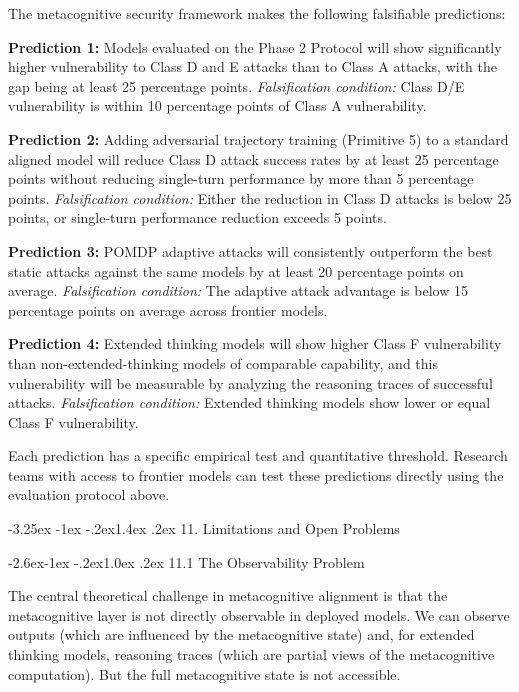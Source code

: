 \documentclass[
  11pt,
]{article}
\makeatletter
\renewcommand\section{\@startsection{section}{1}{\z@}%
  {-3.25ex \@plus -1ex \@minus -.2ex}{1.4ex \@plus.2ex}%
  {\normalfont\sffamily\Large\bfseries}}
\renewcommand\subsection{\@startsection{subsection}{2}{\z@}%
  {-2.6ex\@plus -1ex \@minus -.2ex}{1.0ex \@plus .2ex}%
  {\normalfont\sffamily\large\bfseries}}
\makeatother
\begin{document}
The metacognitive security framework makes the following falsifiable
predictions:

\textbf{Prediction 1:} Models evaluated on the Phase 2 Protocol will
show significantly higher vulnerability to Class D and E attacks than to
Class A attacks, with the gap being at least 25 percentage points.
\emph{Falsification condition:} Class D/E vulnerability is within 10
percentage points of Class A vulnerability.

\textbf{Prediction 2:} Adding adversarial trajectory training (Primitive
5) to a standard aligned model will reduce Class D attack success rates
by at least 25 percentage points without reducing single-turn
performance by more than 5 percentage points. \emph{Falsification
condition:} Either the reduction in Class D attacks is below 25 points,
or single-turn performance reduction exceeds 5 points.

\textbf{Prediction 3:} POMDP adaptive attacks will consistently
outperform the best static attacks against the same models by at least
20 percentage points on average. \emph{Falsification condition:} The
adaptive attack advantage is below 15 percentage points on average
across frontier models.

\textbf{Prediction 4:} Extended thinking models will show higher Class F
vulnerability than non-extended-thinking models of comparable
capability, and this vulnerability will be measurable by analyzing the
reasoning traces of successful attacks. \emph{Falsification condition:}
Extended thinking models show lower or equal Class F vulnerability.

Each prediction has a specific empirical test and quantitative
threshold. Research teams with access to frontier models can test these
predictions directly using the evaluation protocol above.

\section{11. Limitations and Open
Problems}\label{limitations-and-open-problems}

\subsection{11.1 The Observability
Problem}\label{the-observability-problem}

The central theoretical challenge in metacognitive alignment is that the
metacognitive layer is not directly observable in deployed models. We
can observe outputs (which are influenced by the metacognitive state)
and, for extended thinking models, reasoning traces (which are partial
views of the metacognitive computation). But the full metacognitive
state is not accessible.
\end{document}
